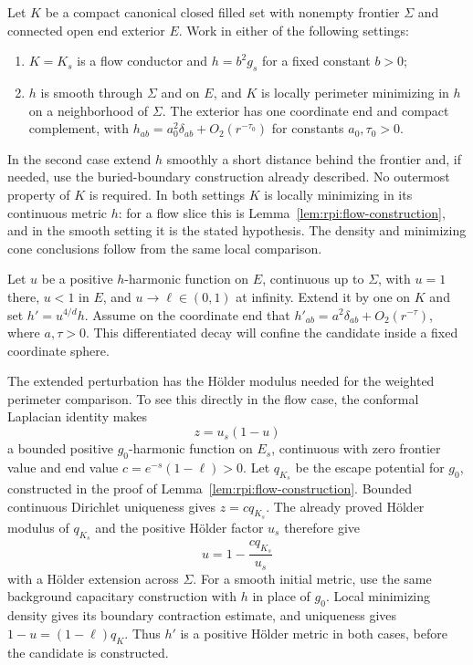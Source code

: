 Let $K$ be a compact canonical closed filled set with nonempty
frontier $\Sigma$ and connected open end exterior $E$. Work in either
of the following settings:
\begin{enumerate}
\item $K=K_s$ is a flow conductor and $h=b^2g_s$ for a fixed
      constant $b>0$;
\item $h$ is smooth through $\Sigma$ and on $E$, and $K$ is
      locally perimeter minimizing in $h$ on a neighborhood of
      $\Sigma$. The exterior has one coordinate end and compact
      complement, with $h_{ab}=a_0^2\delta_{ab}+O_2(r^{-\tau_0})$
      for constants $a_0,\tau_0>0$.
\end{enumerate}
In the second case extend $h$ smoothly a short distance behind the
frontier and, if needed, use the buried-boundary construction already
described. No outermost property of $K$ is required. In both settings
$K$ is locally minimizing in its continuous metric $h$: for a flow
slice this is Lemma~\ref{lem:rpi:flow-construction}, and in the
smooth setting it is the stated hypothesis. The density and minimizing
cone conclusions follow from the same local comparison.

Let $u$ be a positive $h$-harmonic function on $E$, continuous up to
$\Sigma$, with $u=1$ there, $u<1$ in $E$, and $u\to\ell\in(0,1)$
at infinity. Extend it by one on $K$ and set $h'=u^{4/d}h$.
Assume on the coordinate end that
$h'_{ab}=a^2\delta_{ab}+O_2(r^{-\tau})$, where $a,\tau>0$.
This differentiated decay will confine the candidate inside a fixed
coordinate sphere.

The extended perturbation has the H\"older modulus needed for the
weighted perimeter comparison. To see this directly in the flow
case, the conformal Laplacian identity makes
\[
 z=u_s(1-u)
\]
a bounded positive $g_0$-harmonic function on $E_s$, continuous with
zero frontier value and end value
$c=e^{-s}(1-\ell)>0$. Let $q_{K_s}$ be the escape potential for
$g_0$, constructed in the proof of
Lemma~\ref{lem:rpi:flow-construction}. Bounded continuous Dirichlet
uniqueness gives $z=cq_{K_s}$. The already proved H\"older modulus
of $q_{K_s}$ and the positive H\"older factor $u_s$ therefore give
\[
 u=1-\frac{cq_{K_s}}{u_s}
\]
with a H\"older extension across $\Sigma$. For a smooth initial
metric, use the same background capacitary construction with $h$ in
place of $g_0$. Local minimizing density gives its boundary
contraction estimate, and uniqueness gives
$1-u=(1-\ell)q_K$. Thus $h'$ is a positive H\"older metric in
both cases, before the candidate is constructed.

